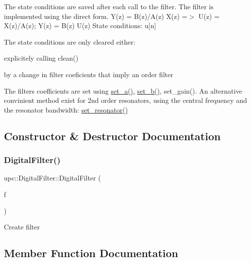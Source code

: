 The state conditions are saved after each call to the filter. The filter is implemented using the direct form. Y(z) = B(z)/A(z) X(z) =$>$ U(z) = X(z)/A(z); Y(z) = B(z) U(z) State conditions\+: u\mbox{[}n\mbox{]}

The state conditions are only cleared either\+:
\begin{DoxyItemize}
\item explicitely calling clean()
\item by a change in filter coeficients that imply an order filter
\end{DoxyItemize}

The filters coefficients are set using \hyperlink{classupc_1_1DigitalFilter_ade3c3a24bbfbc1b2edbf4bcd0885a9e6}{set\+\_\+a()}, \hyperlink{classupc_1_1DigitalFilter_a9f23a5e9db027eb0c9b70bd9b5d08e09}{set\+\_\+b()}, set\+\_\+gain(). An alternative convinient method exist for 2nd order resonators, using the central frequency and the resonator bandwidth\+: \hyperlink{classupc_1_1DigitalFilter_a2b97aaeacac8b5a8b52e1bd8fc295970}{set\+\_\+resonator()} 

\subsection{Constructor \& Destructor Documentation}
\mbox{\label{classupc_1_1DigitalFilter_a54937beb73f0789cb9265498522da628}} 
\subsubsection{\texorpdfstring{Digital\+Filter()}{DigitalFilter()}}
{\footnotesize\ttfamily upc\+::\+Digital\+Filter\+::\+Digital\+Filter (\begin{DoxyParamCaption}\item[{const \hyperlink{classupc_1_1DigitalFilter}{Digital\+Filter} \&}]{f }\end{DoxyParamCaption})\hspace{0.3cm}{\ttfamily [inline]}}

Create filter 

\subsection{Member Function Documentation}
\mbox{\label{classupc_1_1DigitalFilter_a03537f0f0604b772f8f6ee3cc08f194e}} 

